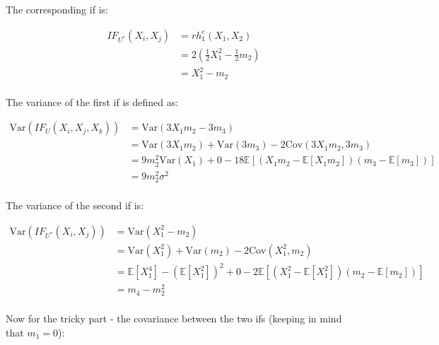 \documentclass{report}
\begin{document}
The corresponding \gls{if} is:

\begin{equation}\label{eq:ex-lst-u-statistic-joint-variance-if}
    \begin{aligned}
        IF_{U^*}(X_i, X_j)
          &= rh_1^c(X_1, X_2) \\
          &= 2 \left(\frac{1}{2}X_1^2 - \frac{1}{2}m_2\right) \\
          &= X_1^2 - m_2 \\
    \end{aligned}
\end{equation}

The variance of the first \gls{if} is defined as:

\begin{equation}\label{eq:ex-lst-u-statistic-joint-m3-if-variance}
    \begin{aligned}
        \text{Var}\left(IF_U(X_i, X_j, X_k)\right)
          &= \text{Var}(3X_1m_2 - 3m_3) \\
          &= \text{Var}(3X_1m_2) + \text{Var}(3m_3) - 2\text{Cov}(3X_1m_2, 3m_3) \\
          &= 9m_2^2\text{Var}(X_1) + 0 - 18\mathbb{E}\left[(X_1m_2 - \mathbb{E}[X_1m_2])(m_3 - \mathbb{E}[m_3])\right] \\
          &= 9m_2^2\sigma^2 \\
    \end{aligned}
\end{equation}

The variance of the second \gls{if} is:

\begin{equation}\label{eq:ex-lst-u-statistic-joint-variance-if-variance}
    \begin{aligned}
        \text{Var}\left(IF_{U^*}(X_i, X_j)\right)
          &= \text{Var}(X_1^2 - m_2) \\
          &= \text{Var}(X_1^2) + \text{Var}(m_2) - 2\text{Cov}(X_1^2, m_2) \\
          &= \mathbb{E}[X_1^4] - \left(\mathbb{E}[X_1^2]\right)^2 + 0 - 2\mathbb{E}\left[(X_1^2 - \mathbb{E}[X_1^2])(m_2 - \mathbb{E}[m_2])\right] \\
          &= m_4 - m_2^2 \\
    \end{aligned}
\end{equation}

Now for the tricky part - the covariance between the two \glspl{if} (keeping in mind that $m_1 = 0$):
\end{document}
